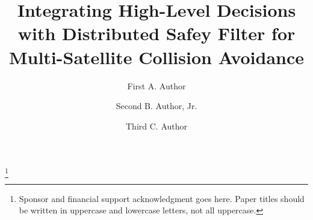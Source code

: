 \documentclass{ifacconf}
\begin{document}
\begin{frontmatter}

\title{Integrating High-Level Decisions with Distributed Safey Filter for Multi-Satellite Collision Avoidance} 

\thanks[footnoteinfo]{Sponsor and financial support acknowledgment
goes here. Paper titles should be written in uppercase and lowercase
letters, not all uppercase.}

\author[First]{First A. Author} 
\author[Second]{Second B. Author, Jr.} 
\author[Third]{Third C. Author}

\address[First]{National Institute of Standards and Technology, 
   Boulder, CO 80305 USA (e-mail: author@ boulder.nist.gov).}
\address[Second]{Colorado State University, 
   Fort Collins, CO 80523 USA (e-mail: author@lamar. colostate.edu)}
\address[Third]{Electrical Engineering Department, 
   Seoul National University, Seoul, Korea, (e-mail: author@snu.ac.kr)}

\begin{abstract}                %


\end{abstract}
\end{frontmatter}
\end{document}
